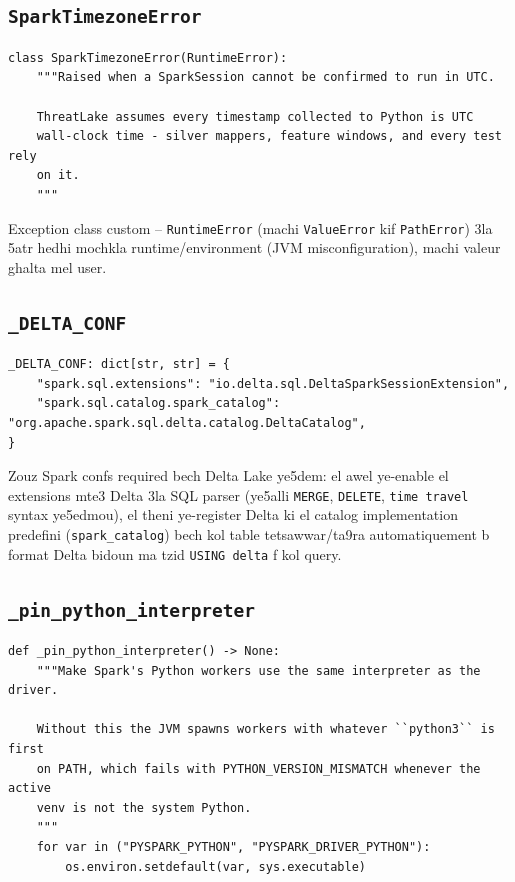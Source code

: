 \documentclass[11pt,a4paper]{report}
\DeclareRobustCommand{\code}[1]{\texttt{#1}}
\begin{document}
\subsection{\code{SparkTimezoneError}}

\begin{lstlisting}[style=pystyle]
class SparkTimezoneError(RuntimeError):
    """Raised when a SparkSession cannot be confirmed to run in UTC.

    ThreatLake assumes every timestamp collected to Python is UTC
    wall-clock time - silver mappers, feature windows, and every test rely
    on it.
    """
\end{lstlisting}

Exception class custom -- \code{RuntimeError} (machi \code{ValueError} kif
\code{PathError}) 3la 5atr hedhi mochkla runtime/environment (JVM
misconfiguration), machi valeur ghalta mel user.

\subsection{\code{\_DELTA\_CONF}}

\begin{lstlisting}[style=pystyle]
_DELTA_CONF: dict[str, str] = {
    "spark.sql.extensions": "io.delta.sql.DeltaSparkSessionExtension",
    "spark.sql.catalog.spark_catalog": "org.apache.spark.sql.delta.catalog.DeltaCatalog",
}
\end{lstlisting}

Zouz Spark confs required bech Delta Lake ye5dem: el awel ye-enable el
extensions mte3 Delta 3la SQL parser (ye5alli \code{MERGE}, \code{DELETE},
\code{time travel} syntax ye5edmou), el theni ye-register Delta ki el
catalog implementation predefini (\code{spark\_catalog}) bech kol table
tetsawwar/ta9ra automatiquement b format Delta bidoun ma tzid \code{USING
delta} f kol query.

\subsection{\code{\_pin\_python\_interpreter}}

\begin{lstlisting}[style=pystyle]
def _pin_python_interpreter() -> None:
    """Make Spark's Python workers use the same interpreter as the driver.

    Without this the JVM spawns workers with whatever ``python3`` is first
    on PATH, which fails with PYTHON_VERSION_MISMATCH whenever the active
    venv is not the system Python.
    """
    for var in ("PYSPARK_PYTHON", "PYSPARK_DRIVER_PYTHON"):
        os.environ.setdefault(var, sys.executable)
\end{lstlisting}
\end{document}
